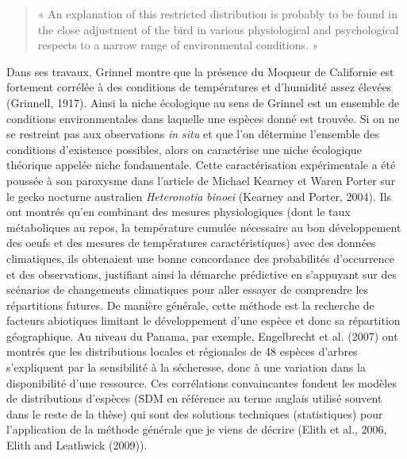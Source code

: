 \begin{quote}
« An explanation of this restricted distribution is probably to be found
in the close adjustment of the bird in various physiological and
psychological respects to a narrow range of environmental conditions. »
\end{quote}

Dans ses travaux, Grinnel montre que la présence du Moqueur de
Californie est fortement corrélée à des conditions de températures et
d'humidité assez élevées (Grinnell, 1917). Ainsi la niche écologique au
sens de Grinnel est un ensemble de conditions environmentales dans
laquelle une espèces donné est trouvée. Si on ne se restreint pas aux
observations \emph{in situ} et que l'on détermine l'ensemble des
conditions d'existence possibles, alors on caractérise une niche
écologique théorique appelée niche fondamentale. Cette caractérisation
expérimentale a été poussée à son paroxysme dans l'article de Michael
Kearney et Waren Porter sur le gecko nocturne australien
\emph{Heteronotia binoei} (Kearney and Porter, 2004). Ils ont montrés
qu'en combinant des mesures physiologiques (dont le taux métaboliques au
repos, la température cumulée nécessaire au bon développement des oeufs
et des mesures de températures caractéristiques) avec des données
climatiques, ils obtenaient une bonne concordance des probabilités
d'occurrence et des observations, justifiant ainsi la démarche
prédictive en s'appuyant sur des scénarios de changements climatiques
pour aller essayer de comprendre les répartitions futures. De manière
générale, cette méthode est la recherche de facteurs abiotiques limitant
le développement d'une espèce et donc sa répartition géographique. Au
niveau du Panama, par exemple, Engelbrecht et al. (2007) ont montrés que
les distributions locales et régionales de 48 espèces d'arbres
s'expliquent par la sensibilité à la sécheresse, donc à une variation
dans la disponibilité d'une ressource. Ces corrélations convaincantes
fondent les modèles de distributions d'espèces (SDM en référence au
terme anglais utilisé souvent dans le reste de la thèse) qui sont des
solutions techniques (statistiques) pour l'application de la méthode
générale que je viens de décrire (Elith et al., 2006, Elith and
Leathwick (2009)).

